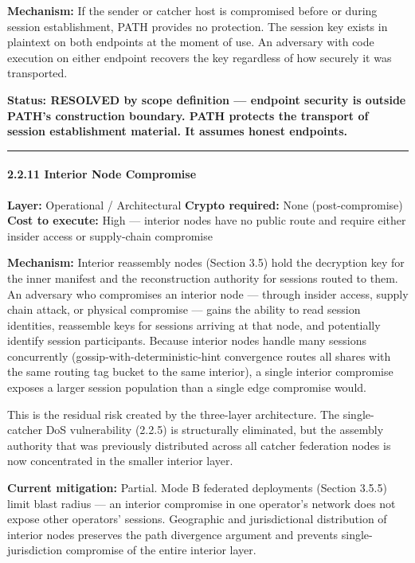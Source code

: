 \documentclass[
  11pt,
]{article}
\begin{document}
\textbf{Mechanism:} If the sender or catcher host is compromised before
or during session establishment, PATH provides no protection. The
session key exists in plaintext on both endpoints at the moment of use.
An adversary with code execution on either endpoint recovers the key
regardless of how securely it was transported.

\textbf{Status: RESOLVED by scope definition --- endpoint security is
outside PATH's construction boundary. PATH protects the transport of
session establishment material. It assumes honest endpoints.}

\begin{center}\rule{0.5\linewidth}{0.5pt}\end{center}

\hypertarget{interior-node-compromise}{%
\paragraph{2.2.11 Interior Node
Compromise}\label{interior-node-compromise}}

\textbf{Layer:} Operational / Architectural \textbf{Crypto required:}
None (post-compromise) \textbf{Cost to execute:} High --- interior nodes
have no public route and require either insider access or supply-chain
compromise

\textbf{Mechanism:} Interior reassembly nodes (Section 3.5) hold the
decryption key for the inner manifest and the reconstruction authority
for sessions routed to them. An adversary who compromises an interior
node --- through insider access, supply chain attack, or physical
compromise --- gains the ability to read session identities, reassemble
keys for sessions arriving at that node, and potentially identify
session participants. Because interior nodes handle many sessions
concurrently (gossip-with-deterministic-hint convergence routes all
shares with the same routing tag bucket to the same interior), a single
interior compromise exposes a larger session population than a single
edge compromise would.

This is the residual risk created by the three-layer architecture. The
single-catcher DoS vulnerability (2.2.5) is structurally eliminated, but
the assembly authority that was previously distributed across all
catcher federation nodes is now concentrated in the smaller interior
layer.

\textbf{Current mitigation:} Partial. Mode B federated deployments
(Section 3.5.5) limit blast radius --- an interior compromise in one
operator's network does not expose other operators' sessions. Geographic
and jurisdictional distribution of interior nodes preserves the path
divergence argument and prevents single-jurisdiction compromise of the
entire interior layer.
\end{document}
